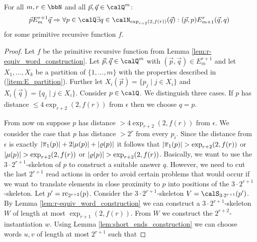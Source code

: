 \begin{lemma}\label{lem:EF_relations}
	For all $m,r\in\bbN$ and all $\vec{p},\vec{q}\in \Qx^m$:  
	\[\vec{p} E^{r+1}_m \vec{q} \Rightarrow \forall p\in \Qx \exists q\in \calN_{\exp_{r+2}(2,f(r))}(\vec{q}): (\vec{p}, p) E^{r}_{m+1} (\vec{q}, q)\]
	for some primitive recursive function $f$.
\end{lemma}
\begin{proof}
	Let $f$ be the primitive recursive function from Lemma \ref{lem:r-equiv_word_construction}.
	Let $\vec{p}, \vec{q} \in \Qx^m$ with $(\vec{p}, \vec{q}) \in E^{r+1}_m$ and 
	let $X_1,\ldots,X_k$ be a partition of $\{1,\ldots,m\}$ with the properties described in (\ref{item:E_partition}). Further let $X_i(\vec{p}) = \{p_j \mid j\in X_i \}$ and $X_i(\vec{q}) = \{q_j \mid j\in X_i \}$. Consider $p\in \Qx$. We distinguish three cases.
	If $p$ has distance $\leq 4\exp_{r+2}(2, f(r))$ from $\epsilon$ then we choose $q=p$.
	
	From now on suppose $p$ has distance $> 4\exp_{r+2}(2, f(r))$ from $\epsilon$.
	We consider the case that $p$ has distance $>2^r$ from every $p_i$.
	Since the distance from $\epsilon$ is exactly $|\overline{\pi}_1(p)| + 2|\mu(p)| + |\varrho(p)|$ it follows that $|\overline{\pi}_1(p)| > \exp_{r+2}(2,f(r))$ or $|\mu(p)| > \exp_{r+2}(2,f(r))$ or $|\varrho(p)| > \exp_{r+2}(2,f(r))$. 
	Basically, we want to use the $3\cdot 2^{r+1}$-skeleton of $p$ to construct a suitable answer $q$. However, we need to cut the last $2^{r+1}$ read actions in order to avoid certain problems that would occur if we want to translate elements in close proximity to $p$ into positions of the $3\cdot 2^{r+1}$-skeleton.   
	Let $p'= \operatorname{rc}_{2^{r+2}}(p)$.  Consider 
	the $3\cdot 2^{r+1}$-skeleton $V = \calS_{3\cdot 2^{r+1}}(p')$. By Lemma \ref{lem:r-equiv_word_construction} we can construct a $3\cdot 2^{r+1}$-skeleton $W$ of length at most $\exp_{r+1}(2,f(r))$. From $W$ we construct the $2^{r+2}$-instantiation $w$. Using Lemma \ref{lem:short_ends_construction} we can choose words $u,v$ of length at most 
	$2^{r+1}$ such that 
	

\end{proof}
